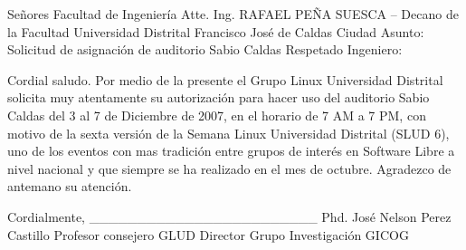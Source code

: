Señores
Facultad de Ingeniería
Atte. Ing. RAFAEL PEÑA SUESCA – Decano de la Facultad
Universidad Distrital Francisco José de Caldas
Ciudad
Asunto: Solicitud de asignación de auditorio Sabio Caldas
Respetado Ingeniero:


Cordial saludo. Por medio de la presente el Grupo Linux Universidad Distrital solicita muy
atentamente su autorización para hacer uso del auditorio Sabio Caldas del 3 al 7 de
Diciembre de 2007, en el horario de 7 AM a 7 PM, con motivo de la sexta versión de la
Semana Linux Universidad Distrital (SLUD 6), uno de los eventos con mas tradición
entre grupos de interés en Software Libre a nivel nacional y que siempre se ha realizado en
el mes de octubre.
Agradezco de antemano su atención.


Cordialmente,
________________________
Phd. José Nelson Perez Castillo
Profesor consejero GLUD
Director Grupo Investigación GICOG